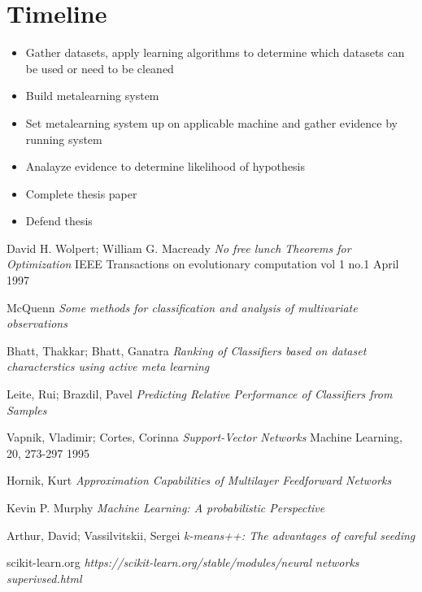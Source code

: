 \documentclass[a4paper,11pt]{article}
\begin{document}
\section{Timeline}
  \begin{itemize}
  \item Gather datasets, apply learning algorithms to determine which datasets can be used or need to be cleaned
  \item Build metalearning system
  \item Set metalearning system up on applicable machine and gather evidence by running system
  \item Analayze evidence to determine likelihood of hypothesis
  \item Complete thesis paper
  \item Defend thesis
  \end{itemize}
\begin{thebibliography}{9}
  David H. Wolpert; William G. Macready
  \textit{No free lunch Theorems for Optimization}
  IEEE Transactions on evolutionary computation vol 1 no.1 April 1997

  McQuenn
  \textit{Some methods for classification and analysis of multivariate observations}

  Bhatt, Thakkar; Bhatt, Ganatra
  \textit{Ranking of Classifiers based on dataset characterstics using active meta learning}

  Leite, Rui; Brazdil, Pavel
  \textit{Predicting Relative Performance of Classifiers from Samples}

  Vapnik, Vladimir; Cortes, Corinna
  \textit{Support-Vector Networks}
  Machine Learning, 20, 273-297 1995

  Hornik, Kurt
  \textit{Approximation Capabilities of Multilayer Feedforward Networks}

  Kevin P. Murphy
  \textit{Machine Learning: A probabilistic Perspective}

  Arthur, David; Vassilvitskii, Sergei
  \textit{k-means++: The advantages of careful seeding}

  scikit-learn.org
  \textit{https://scikit-learn.org/stable/modules/neural networks superivsed.html}

\end{thebibliography}
\end{document}
